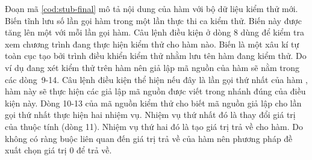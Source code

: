 Đoạn mã \autoref{cod:stub-final} mô tả nội dung của hàm  với bộ dữ liệu kiểm thử mới. Biến tĩnh  lưu số lần gọi hàm trong một lần thực thi ca kiểm thử. Biến này được tăng lên một với mỗi lần gọi hàm. Câu lệnh điều kiện ở dòng 8 dùng để kiểm tra xem chương trình đang thực hiện kiểm thử cho hàm nào. Biến  là một xâu kí tự toàn cục tạo bởi trình điều khiển kiểm thử nhằm lưu tên hàm đang kiểm thử. Do ví dụ đang xét kiểm thử trên hàm  nên giả lập mã nguồn của hàm  sẽ nằm trong các dòng~9-14. Câu lệnh điều kiện  thể hiện nếu đây là lần gọi thứ nhất của hàm , hàm này sẽ thực hiện các giả lập mã nguồn được viết trong nhánh đúng của điều kiện này. Dòng 10-13 của mã nguồn kiểm thử cho biết mã nguồn giả lập cho lần gọi thứ nhất thực hiện hai nhiệm vụ. Nhiệm vụ thứ nhất đó là thay đổi giá trị của thuộc tính  (dòng 11). Nhiệm vụ thứ hai đó là tạo giá trị trả về cho hàm. Do không có ràng buộc liên quan đến giá trị trả về của hàm  nên phương pháp đề xuất chọn giá trị 0 để trả về.